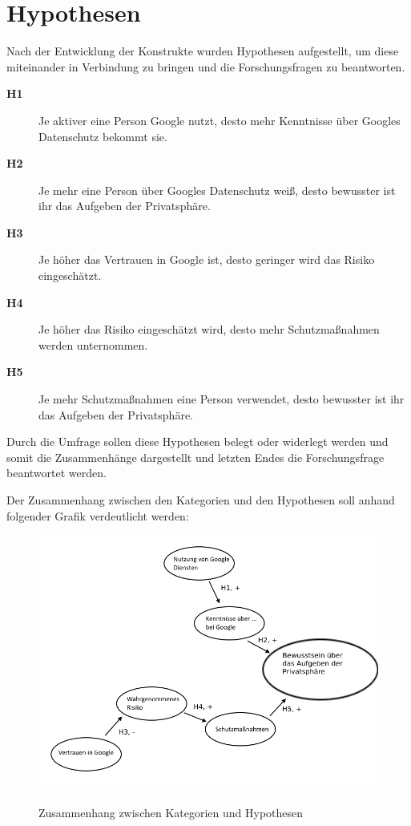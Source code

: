 \section{Hypothesen}
Nach der Entwicklung der Konstrukte wurden Hypothesen aufgestellt, um diese miteinander in Verbindung zu bringen und die Forschungsfragen zu beantworten.
\begin{description}
\item[\label{itm:H0}\textbf{H1}]Je aktiver eine Person Google nutzt, desto mehr Kenntnisse über Googles Datenschutz bekommt sie.
\item[\label{itm:H1}\textbf{H2}]Je mehr eine Person über Googles Datenschutz weiß, desto bewusster ist ihr das Aufgeben der Privatsphäre.
\item[\label{itm:H2}\textbf{H3}]Je höher das Vertrauen in Google ist, desto geringer wird das Risiko eingeschätzt.
\item[\label{itm:H3}\textbf{H4}]Je höher das Risiko eingeschätzt wird, desto mehr Schutzmaßnahmen werden unternommen.
\item[\label{itm:H4}\textbf{H5}]Je mehr Schutzmaßnahmen eine Person verwendet, desto bewusster ist ihr das Aufgeben der Privatsphäre.
\end{description}

Durch die Umfrage sollen diese Hypothesen belegt oder widerlegt werden und somit die Zusammenhänge dargestellt und letzten Endes die Forschungsfrage beantwortet werden.

Der Zusammenhang zwischen den Kategorien und den Hypothesen soll anhand folgender Grafik verdeutlicht werden:
\begin{figure}[H]
\centering
\includegraphics[scale=0.55]{images/bubbles}\\
\caption{Zusammenhang zwischen Kategorien und Hypothesen}\label{bubbles}
\end{figure}

